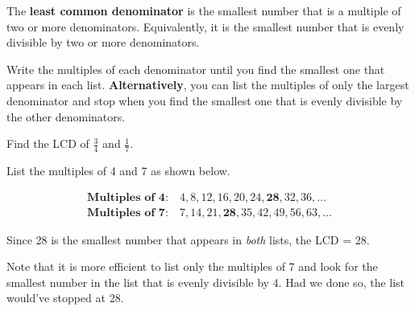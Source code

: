 \documentclass{ximera}
\begin{document}
\begin{definition}

The \textbf{least common denominator} is the smallest number that is a multiple of two or more denominators.  Equivalently, it is the smallest number that is
evenly divisible by two or more denominators.

\end{definition}

\begin{procedure}

Write the multiples of each denominator until you find the smallest one that appears in each list.  \textbf{Alternatively}, you can list
the multiples of only the largest denominator and stop when you find the smallest one that is evenly divisible by the other denominators.
\end{procedure}


\begin{example}

Find the LCD of $\frac{3}{4}$ and $\textstyle \frac{1}{7}.$ 


\begin{explanation}

List the multiples of 4 and 7 as shown below.   

\begin{align*}
\textbf{Multiples of 4}: \ & 4, 8, 12, 16, 20, 24, \mathbf{28}, 32, 36, \ldots \\
\textbf{Multiples of 7}: \ & 7, 14, 21, \mathbf{28}, 35, 42, 49, 56, 63, \ldots
\end{align*}

Since 28 is the smallest number that appears in \textit{both} lists, the LCD = 28. 

\begin{remark}
Note that it is more efficient to list only the multiples of 7 and look for the smallest number in the list that is 
evenly divisible by 4.  Had we done so, the list would've stopped at 28.  

\end{remark}
\end{explanation}

\end{example}
\end{document}

